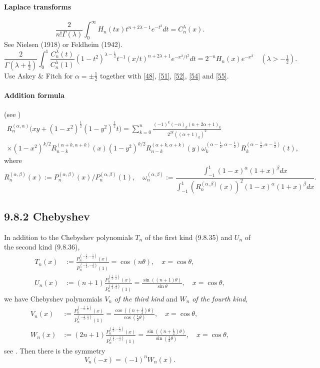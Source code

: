 \documentclass[twoside,11pt]{article}
\newcommand\al\alpha
\newcommand\be\beta
\newcommand\tha\theta
\newcommand\la\lambda
\newcommand\om\omega
\newcommand\Ga{\Gamma}
\newcommand\half{\frac12}
\newcommand\thalf{\tfrac12}
\newcommand\iy\infty
\begin{document}
\paragraph{Laplace transforms}
\begin{equation}
\frac2{n! \Ga(\la)} 
\int_0^\iy H_n(tx) t^{n+2\la-1} e^{-t^2} dt=C_n^\la(x).
\label{56}
\end{equation}
See Nielsen \cite[p.48, (4) with p.47, (1) and p.28, (10)]{K4} (1918)
or Feldheim \cite[(28)]{K3} (1942).
\begin{equation}
\frac2{\Ga(\la+\thalf)} \int_0^1 \frac{C_n^\la(t)}{C_n^\la(1)} 
(1-t^2)^{\la-\half} t^{-1} (x/t)^{n+2\la+1} e^{-x^2/t^2} dt
=2^{-n} H_n(x) e^{-x^2}\quad(\la>-\thalf).
\label{46}
\end{equation}
Use Askey \& Fitch \cite[(3.29)]{K2} for $\al=\pm\thalf$ together with
\eqref{48}, \eqref{51}, \eqref{52}, \eqref{54} and \eqref{55}.
\paragraph{Addition formula} (see \mycite{AAR}{(9.8.5$'$)]})
\begin{multline}
R_n^{(\al,\al)}\big(xy+(1-x^2)^\half(1-y^2)^\half t\big)
=\sum_{k=0}^n \frac{(-1)^k(-n)_k (n+2\al+1)_k}{2^{2k}((\al+1)_k)^2}\\
\times(1-x^2)^{k/2} R_{n-k}^{(\al+k,\al+k)}(x) (1-y^2)^{k/2} R_{n-k}^{(\al+k,\al+k)}(y) 
\om_k^{(\al-\half,\al-\half)} R_k^{(\al-\half,\al-\half)}(t),
\label{108}
\end{multline}
where
\[
R_n^{(\al,\be)}(x):=P_n^{(\al,\be)}(x)/P_n^{(\al,\be)}(1),\quad
\om_n^{(\al,\be)}:=\frac{\int_{-1}^1 (1-x)^\al(1+x)^\be dx}
{\int_{-1}^1 (R_n^{(\al,\be)}(x))^2 (1-x)^\al(1+x)^\be dx} .
\]
%
\subsection*{9.8.2 Chebyshev}
\label{sec9.8.2}
In addition to the Chebyshev polynomials $T_n$ of the first kind (9.8.35)
and $U_n$ of the second kind (9.8.36),
\begin{align}
T_n(x)&:=\frac{P_n^{(-\half,-\half)}(x)}{P_n^{(-\half,-\half)}(1)}
=\cos(n\tha),\quad x=\cos\tha,\\
U_n(x)&:=(n+1) \frac{P_n^{(\half,\half)}(x)}{P_n^{(\half,\half)}(1)}
=\frac{\sin((n+1)\tha)}{\sin\tha} ,\quad x=\cos\tha,
\end{align}
we have Chebyshev polynomials $V_n$ {\em of the third kind}
and $W_n$ {\em of the fourth kind},
\begin{align}
V_n(x)&:=\frac{P_n^{(-\half,\half)}(x)}{P_n^{(-\half,\half)}(1)}
=\frac{\cos((n+\thalf)\tha)}{\cos(\thalf\tha)} ,\quad x=\cos\tha,\\
W_n(x)&:=(2n+1) \frac{P_n^{(\half,-\half)}(x)}{P_n^{(\half,-\half)}(1)}
=\frac{\sin((n+\thalf)\tha)}{\sin(\thalf\tha)} ,\quad x=\cos\tha,
\end{align}
see \cite[Section 1.2.3]{K20}. Then there is the symmetry
\begin{equation}
V_n(-x)=(-1)^n W_n(x).
\label{140}
\end{equation}
\end{document}
